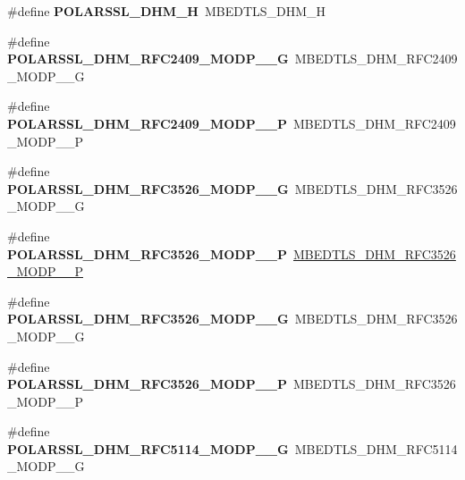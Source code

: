 \begin{DoxyCompactItemize}
\#define {\bfseries P\+O\+L\+A\+R\+S\+S\+L\+\_\+\+D\+H\+M\+\_\+H}~M\+B\+E\+D\+T\+L\+S\+\_\+\+D\+H\+M\+\_\+H
\item 
\mbox{\label{compat-1_83_8h_a390dad70476de288d7210be9b626b3b6}} 
\#define {\bfseries P\+O\+L\+A\+R\+S\+S\+L\+\_\+\+D\+H\+M\+\_\+\+R\+F\+C2409\+\_\+\+M\+O\+D\+P\+\_\+\_\+G}~M\+B\+E\+D\+T\+L\+S\+\_\+\+D\+H\+M\+\_\+\+R\+F\+C2409\+\_\+\+M\+O\+D\+P\+\_\+\_\+G
\item 
\mbox{\label{compat-1_83_8h_a7920b16e2d34a964afb57ae5294f7559}} 
\#define {\bfseries P\+O\+L\+A\+R\+S\+S\+L\+\_\+\+D\+H\+M\+\_\+\+R\+F\+C2409\+\_\+\+M\+O\+D\+P\+\_\+\_\+P}~M\+B\+E\+D\+T\+L\+S\+\_\+\+D\+H\+M\+\_\+\+R\+F\+C2409\+\_\+\+M\+O\+D\+P\+\_\+\_\+P
\item 
\mbox{\label{compat-1_83_8h_aeeb38830e9a14b96a6a5d318fe11f3a0}} 
\#define {\bfseries P\+O\+L\+A\+R\+S\+S\+L\+\_\+\+D\+H\+M\+\_\+\+R\+F\+C3526\+\_\+\+M\+O\+D\+P\+\_\+\_\+G}~M\+B\+E\+D\+T\+L\+S\+\_\+\+D\+H\+M\+\_\+\+R\+F\+C3526\+\_\+\+M\+O\+D\+P\+\_\+\_\+G
\item 
\mbox{\label{compat-1_83_8h_a35fc616956ba7661e73d34785f960b63}} 
\#define {\bfseries P\+O\+L\+A\+R\+S\+S\+L\+\_\+\+D\+H\+M\+\_\+\+R\+F\+C3526\+\_\+\+M\+O\+D\+P\+\_\+\_\+P}~\mbox{\hyperlink{dhm_8h_a8625d753bfb49304c83ec1a459446cd5}{M\+B\+E\+D\+T\+L\+S\+\_\+\+D\+H\+M\+\_\+\+R\+F\+C3526\+\_\+\+M\+O\+D\+P\+\_\+\_\+P}}
\item 
\mbox{\label{compat-1_83_8h_a0d4454178f836ee4e18265203d9b8f7e}} 
\#define {\bfseries P\+O\+L\+A\+R\+S\+S\+L\+\_\+\+D\+H\+M\+\_\+\+R\+F\+C3526\+\_\+\+M\+O\+D\+P\+\_\+\_\+G}~M\+B\+E\+D\+T\+L\+S\+\_\+\+D\+H\+M\+\_\+\+R\+F\+C3526\+\_\+\+M\+O\+D\+P\+\_\+\_\+G
\item 
\mbox{\label{compat-1_83_8h_ad4487a84f22e7d49270ac6c0f07dfdee}} 
\#define {\bfseries P\+O\+L\+A\+R\+S\+S\+L\+\_\+\+D\+H\+M\+\_\+\+R\+F\+C3526\+\_\+\+M\+O\+D\+P\+\_\+\_\+P}~M\+B\+E\+D\+T\+L\+S\+\_\+\+D\+H\+M\+\_\+\+R\+F\+C3526\+\_\+\+M\+O\+D\+P\+\_\+\_\+P
\item 
\mbox{\label{compat-1_83_8h_aee8dd3aaa038de9299e4228c461dd7d0}} 
\#define {\bfseries P\+O\+L\+A\+R\+S\+S\+L\+\_\+\+D\+H\+M\+\_\+\+R\+F\+C5114\+\_\+\+M\+O\+D\+P\+\_\+\_\+G}~M\+B\+E\+D\+T\+L\+S\+\_\+\+D\+H\+M\+\_\+\+R\+F\+C5114\+\_\+\+M\+O\+D\+P\+\_\+\_\+G

\end{DoxyCompactItemize}
